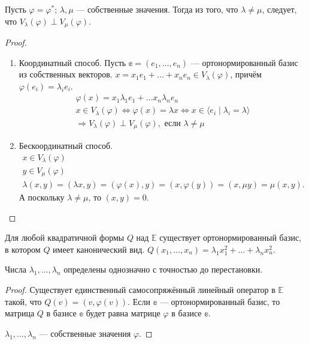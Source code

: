 \begin{Consequence}
	Пусть $\varphi = \varphi^*$; $\lambda, \mu$ --- собственные значения. Тогда из того, что $\lambda \neq \mu$, следует, что $V_\lambda(\varphi)\perp V_\mu(\varphi)$.
\end{Consequence}

\begin{proof}\ 
	\begin{enumerate} 
		\item Координатный способ. Пусть $\mathbb{e} = (e_1, \ldots, e_n)$ --- ортонормированный базис из собственных векторов. $x = x_1e_1 + \ldots + x_ne_n\in V_\lambda(\varphi)$, причём $\varphi(e_i) = \lambda_ie_i$.
		\begin{gather*}
			\varphi(x) = x_1\lambda_1 e_1 + \ldots x_n \lambda_n e_n\\
			x \in V_\lambda(\varphi) \Leftrightarrow \varphi(x) = \lambda x \Leftrightarrow x \in \langle e_i\;|\; \lambda_i = \lambda\rangle\\
			\Rightarrow V_\lambda(\varphi) \perp V_\mu (\varphi),\text{ если } \lambda \neq \mu
		\end{gather*}
		\item Бескоординатный способ. 
		\begin{gather*}
			x \in V_\lambda(\varphi)\\
			y \in V_\mu (\varphi)\\
			\lambda(x,y) = (\lambda x, y) = (\varphi(x), y) = (x, \varphi(y)) = (x, \mu y) = \mu (x, y).
		\end{gather*}
		А поскольку $\lambda \neq \mu$, то $(x,y) = 0$.
	\end{enumerate}
\end{proof}

\begin{Consequence}
	Для любой квадратичной формы $Q$ над $\mathbb{E}$ существует ортонормированный базис, в котором $Q$ имеет канонический вид. $Q(x_1, \ldots, x_n) = \lambda_1 x_1^2 + \ldots + \lambda_n x_n^2$.\\
	\par Числа $\lambda_1, \ldots, \lambda_n$ определены однозначно с точностью до перестановки.
\end{Consequence}

\begin{proof}
	Существует единственный самосопряжённый линейный оператор в $\mathbb{E}$ такой, что $Q(v) = (v, \varphi(v))$. Если $\mathbb{e}$ --- ортонормированный базис, то матрица $Q$ в базисе $\mathbb{e}$ будет равна матрице $\varphi$ в базисе $\mathbb{e}$.
	\par $\lambda_1, \ldots, \lambda_n$ --- собственные значения $\varphi$. 
\end{proof}

